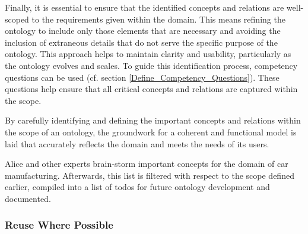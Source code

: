 Finally, it is essential to ensure that the identified concepts and relations are well-scoped to the requirements given within the domain. This means refining the ontology to include only those elements that are necessary and avoiding the inclusion of extraneous details that do not serve the specific purpose of the ontology. This approach helps to maintain clarity and usability, particularly as the ontology evolves and scales. To guide this identification process, competency questions can be used (cf. section \ref{Define_Competency_Questions}). These questions help ensure that all critical concepts and relations are captured within the scope.

By carefully identifying and defining the important concepts and relations within the scope of an ontology, the groundwork for a coherent and functional model is laid that accurately reflects the domain and meets the needs of its users.

\begin{example}
Alice and other experts brain-storm important concepts for the domain of car manufacturing. Afterwards, this list is filtered with respect to the scope defined earlier, compiled into a list of todos for future ontology development and documented.
\end{example}

\subsubsection{Reuse Where Possible}

